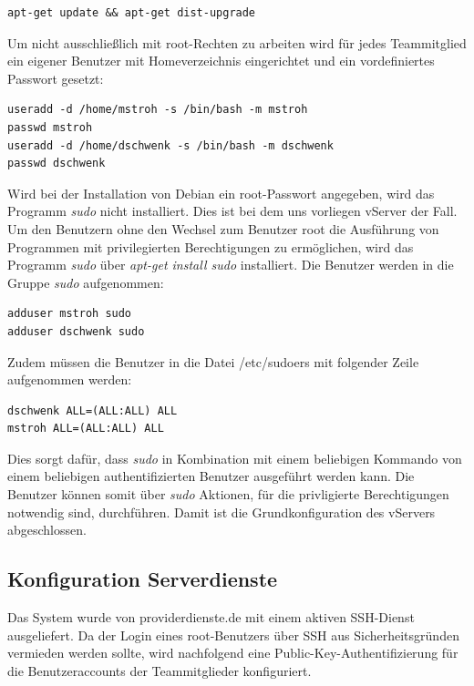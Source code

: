 \begin{lstlisting}[style=customc]
apt-get update && apt-get dist-upgrade
\end{lstlisting}

Um nicht ausschließlich mit root-Rechten zu arbeiten wird für jedes Teammitglied ein eigener Benutzer mit Homeverzeichnis eingerichtet und ein vordefiniertes Passwort gesetzt:

\begin{lstlisting}[style=customc]
useradd -d /home/mstroh -s /bin/bash -m mstroh
passwd mstroh
useradd -d /home/dschwenk -s /bin/bash -m dschwenk
passwd dschwenk
\end{lstlisting}

Wird bei der Installation von Debian ein root-Passwort angegeben, wird das Programm \textit{sudo} nicht installiert. Dies ist bei dem uns vorliegen vServer der Fall. Um den Benutzern ohne den Wechsel zum Benutzer root die Ausführung von Programmen mit privilegierten Berechtigungen zu ermöglichen, wird das Programm \textit{sudo} über \textit{apt-get install sudo} installiert. Die Benutzer werden in die Gruppe \textit{sudo} aufgenommen:

\begin{lstlisting}[style=customc]
adduser mstroh sudo
adduser dschwenk sudo
\end{lstlisting}

Zudem müssen die Benutzer in die Datei /etc/sudoers mit folgender Zeile aufgenommen werden:

\begin{lstlisting}[style=customc]
dschwenk ALL=(ALL:ALL) ALL
mstroh ALL=(ALL:ALL) ALL
\end{lstlisting}

Dies sorgt dafür, dass \textit{sudo} in Kombination mit einem beliebigen Kommando von einem beliebigen authentifizierten Benutzer ausgeführt werden kann. Die Benutzer können somit über \textit{sudo} Aktionen, für die privligierte Berechtigungen notwendig sind, durchführen. Damit ist die Grundkonfiguration des vServers abgeschlossen. %


\subsection{Konfiguration Serverdienste}
\label{subsec:Konfiguration Serverdienste}

Das System wurde von providerdienste.de mit einem aktiven SSH-Dienst ausgeliefert. Da der Login eines root-Benutzers über SSH aus Sicherheitsgründen vermieden werden sollte, wird nachfolgend eine Public-Key-Authentifizierung für die Benutzeraccounts der Teammitglieder konfiguriert.\\

